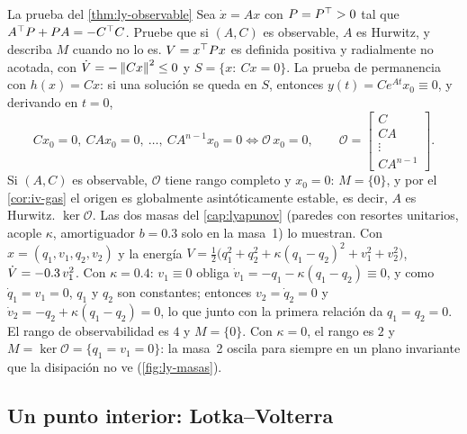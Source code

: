 \begin{ejemplo}[label=ej:iv-observable]{La prueba del \cref{thm:ly-observable}}
Sea $\dot x=Ax$ con $P=P^{\top}>0$ tal que $A^{\top} P+PA=-C^{\top} C$. Pruebe que si $(A,C)$ es observable, $A$ es Hurwitz, y describa $M$ cuando no lo es.
\solucion $V=x^{\top} Px$ es definida positiva y radialmente no acotada, con $\dot V=-\left\lVert Cx\right\rVert^2\le0$ y $S=\{x:\ Cx=0\}$. La prueba de permanencia con $h(x)=Cx$: si una solución se queda en $S$, entonces $y(t)=Ce^{At}x_0\equiv0$, y derivando en $t=0$,
\[
  Cx_0=0,\ CAx_0=0,\ \dots,\ CA^{n-1}x_0=0\iff\mathcal O\,x_0=0,\qquad \mathcal O=\begin{bmatrix}C\\CA\\\vdots\\CA^{n-1}\end{bmatrix}.
\]
Si $(A,C)$ es observable, $\mathcal O$ tiene rango completo y $x_0=0$: $M=\{0\}$, y por el \cref{cor:iv-gas} el origen es globalmente asintóticamente estable, es decir, $A$ es Hurwitz.  $\ker\mathcal O$.
Las dos masas del \cref{cap:lyapunov} (paredes con resortes unitarios, acople $\kappa$, amortiguador $b=0.3$ solo en la masa~1) lo muestran. Con $x=(q_1,v_1,q_2,v_2)$ y la energía $V=\tfrac12\bigl(q_1^2+q_2^2+\kappa(q_1-q_2)^2+v_1^2+v_2^2\bigr)$, $\dot V=-0.3\,v_1^2$. Con $\kappa=0.4$: $v_1\equiv0$ obliga $\dot v_1=-q_1-\kappa(q_1-q_2)\equiv0$, y como $\dot q_1=v_1=0$, $q_1$ y $q_2$ son constantes; entonces $v_2=\dot q_2=0$ y $\dot v_2=-q_2+\kappa(q_1-q_2)=0$, lo que junto con la primera relación da $q_1=q_2=0$. El rango de observabilidad es $4$ y $M=\{0\}$. Con $\kappa=0$, el rango es $2$ y $M=\ker\mathcal O=\{q_1=v_1=0\}$: la masa~2 oscila para siempre en un plano invariante que la disipación no ve (\cref{fig:ly-masas}).
\end{ejemplo}


\subsection{Un punto interior: Lotka--Volterra}

